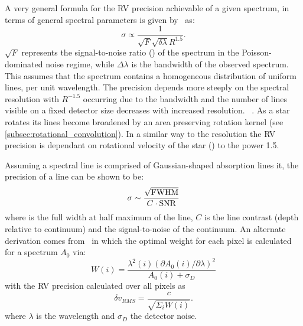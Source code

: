 A very general formula for the {RV} precision achievable of a given spectrum, in terms of general spectral parameters is given by~\citet{hatzes_spectrograph_1992} as:
\begin{equation}
\sigma \propto \frac{1}{\sqrt{F} \sqrt{\delta \lambda} R^{1.5}}.
\end{equation}
$\sqrt{F}$ represents the signal-to-noise ratio (\snr{}) of the spectrum in the {Poisson}-dominated noise regime, while $\Delta \lambda$ is the bandwidth of the observed spectrum.
This assumes that the spectrum contains a homogeneous distribution of uniform lines, per unit wavelength.
The precision depends more steeply on the spectral resolution with $R^{-1.5}$ occurring due to the bandwidth and the number of lines visible on a fixed detector size decreases with increased resolution.
~\citet{hatzes_spectrograph_1992}.
As a star rotates its lines become broadened by an area preserving rotation kernel (see \cref{subsec:rotational_convolution}).
In a similar way to the resolution the {RV} precision is dependant on rotational velocity of the star (\Vsini) to the power 1.5.

Assuming a spectral line is comprised of Gaussian-shaped absorption lines it, the precision of a line can be shown to be:
\begin{equation}
    \sigma\sim\frac{\sqrt{\textrm{FWHM}{}}}{C \cdot \textrm{SNR}}
\end{equation}
where \fwhm{} is the full width at half maximum of the line, $C$ is the line contrast (depth relative to continuum) and \snr{} the signal-to-noise of the continuum.
An alternate derivation comes from~\citet{bouchy_fundamental_2001} in which the optimal weight for each pixel is calculated for a spectrum $A_0$ via:
\begin{equation}
    W(i) = \frac{\lambda^{2}(i) {(\partial A_0(i)/\partial\lambda)}^{2}}{A_0(i) + \sigma_D} \label{eqn:pixel_weigth}
\end{equation}
with the {RV} precision calculated over all pixels as
\begin{equation}
    \delta v_{RMS} = \frac{c}{\sqrt{\Sigma_i W(i)}}.
\end{equation}
where $\lambda$ is the wavelength and $\sigma_D$ the detector noise.

